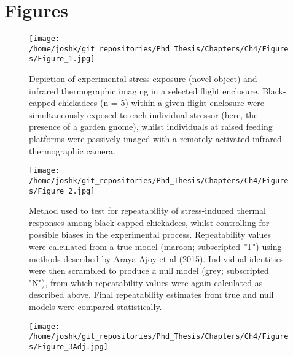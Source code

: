 \documentclass[12pt]{article}
\begin{document}
\clearpage 

\section*{Figures}

\begin{figure}[ht]
	\centering
	\texttt{[image: /home/joshk/git\_repositories/Phd\_Thesis/Chapters/Ch4/Figures/Figure\_1.jpg]}
    \caption[\hspace{0.5cm}Depiction of experimental stress exposure (novel object) and infrared thermographic imaging in a selected flight enclosure.]{Depiction of experimental stress exposure (novel object) and infrared thermographic imaging in a selected flight enclosure. Black-capped chickadees (n = 5) within a given flight enclosure were simultaneously exposed to each individual stressor (here, the presence of a garden gnome), whilst individuals at raised feeding platforms were passively imaged with a remotely activated infrared thermographic camera.
}
\label{Fig4.1}
\end{figure}

\clearpage

\begin{figure}[ht]
	\centering
    \captionsetup{width=0.9\linewidth}
	\texttt{[image: /home/joshk/git\_repositories/Phd\_Thesis/Chapters/Ch4/Figures/Figure\_2.jpg]}
    \caption[\hspace{0.5cm}Method used to test for repeatability of stress-induced thermal responses among black-capped chickadees, whilst controlling for possible biases in the experimental process.]{Method used to test for repeatability of stress-induced thermal responses among black-capped chickadees, whilst controlling for possible biases in the experimental process. Repeatability values were calculated from a true model (maroon; subscripted "T") using methods described by Araya-Ajoy et al (2015). Individual identities were then scrambled to produce a null model (grey; subscripted "N"), from which repeatability values were again calculated as described above. Final repeatability estimates from true and null models were compared statistically.
    }
\label{Fig4.2}
\end{figure}
\clearpage

\begin{figure}[ht]
	\centering
	\texttt{[image: /home/joshk/git\_repositories/Phd\_Thesis/Chapters/Ch4/Figures/Figure\_3Adj.jpg]}
    \captionsetup{labelformat=empty}
    \caption[\hspace{0.5cm}Acute changes in eye region temperature (T\textsubscript{s}) and dry heat transfer (q\textsubscript{Tot}) following stress exposure in black-capped chickadee (n = 19) across ambient temperature.]{ }
\label{Fig4.3}
\end{figure}
\clearpage
\end{document}

